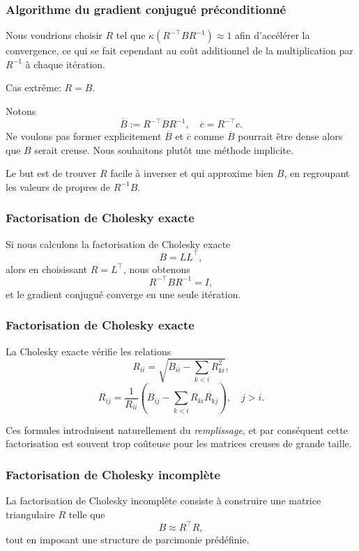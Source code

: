 \documentclass[usepdftitle=false,aspectratio=169]{beamer}
\begin{document}
\begin{frame}
\frametitle{Algorithme du gradient conjugué préconditionné}

Nous voudrions choisir $R$ tel que $\kappa(R^{-\top}BR^{-1}) \approx 1$ afin d'accélérer la convergence, ce qui se fait cependant au coût additionnel de la multiplication par $R^{-1}$ à chaque itération.

\mbox{}

Cas extrême: $R = B$.

\mbox{}

Notons
$$
\overline{B} := R^{-\top}BR^{-1}, \quad \overline{c} = R^{-\top}c.
$$
Ne voulons pas former explicitement $\overline{B}$ et $\overline{c}$ comme $\overline{B}$ pourrait être dense alors que $B$ serait creuse.
Nous souhaitons plutôt une méthode implicite.

\mbox{}

Le but est de trouver $R$ facile à inverser et qui approxime bien $B$, en regroupant les valeurs de propres de $R^{-1}B$.

\end{frame}

\begin{frame}
\frametitle{Factorisation de Cholesky exacte}

Si nous calculons la factorisation de Cholesky exacte
\[
B = L L^{\top},
\]
alors en choisissant $R = L^\top$, nous obtenons
\[
R^{-\top} B R^{-1} = I,
\]
et le gradient conjugué converge en une seule itération.

\end{frame}

\begin{frame}
\frametitle{Factorisation de Cholesky exacte}

La Cholesky exacte vérifie les relations
\[
R_{ii}
= \sqrt{ B_{ii} - \sum_{k<i} R_{k i}^2 },
\]
\[
R_{ij}
= \frac{1}{R_{ii}}
\left(
B_{ij} - \sum_{k<i} R_{k i} R_{k j}
\right),
\quad j>i.
\]

Ces formules introduisent naturellement du \emph{remplissage}, et par conséquent cette factorisation est souvent trop coûteuse pour les matrices
creuses de grande taille.

\end{frame}

\begin{frame}
\frametitle{Factorisation de Cholesky incomplète}

La factorisation de Cholesky incomplète consiste à construire une matrice
triangulaire $R$ telle que
\[
B \approx R^\top R,
\]
tout en imposant une structure de parcimonie prédéfinie.

\end{frame}
\end{document}
